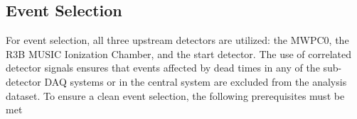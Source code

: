\subsection{Event Selection}\label{subsec:event-sel}
For event selection, all three upstream detectors are utilized: the MWPC0, the R3B MUSIC Ionization Chamber, and the start detector. 
The use of correlated detector signals ensures that events affected by dead times in any of the sub-detector DAQ systems or in the central system are excluded from the analysis dataset.
To ensure a clean event selection, the following prerequisites must be met
